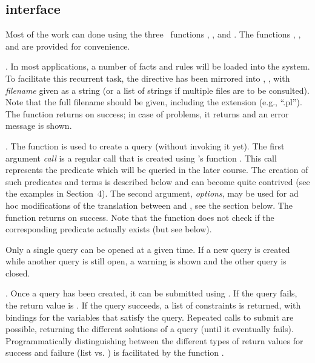 \documentclass[article]{jss}
\begin{document}
\subsection[R interface]{ interface}

Most of the work can done using the 
three \ functions , , and . The
functions , , and  are provided for
convenience.

. In most applications, a number of  facts and
rules will be loaded into the system. To facilitate this recurrent task, 
the  directive  has been mirrored
into , , with \emph{filename} given as a
string (or a list of strings if multiple files are to be consulted). Note that
the full filename should be given, including the extension (e.g., ``.pl'').
The function returns  on success; in case of problems, it
returns  and an error message is shown.

. The function  is used to create a
 query (without invoking it yet). The first 
argument \emph{call} is a regular  call that is created 
using 's function . This call represents
the  predicate which will be queried in the later course. The
creation of such predicates and  terms is described below and
can become quite contrived (see the examples in Section\ 4). The second
argument, \emph{options}, may be used for ad hoc modifications of the
translation between  and , see the section below.
The function returns  on success. Note that the function does not
check if the corresponding  predicate actually exists (but 
see  below).

Only a single query can be opened at a given time. If a new query is created
while another query is still open, a warning is shown and the other query is
closed.

. Once a query has been created, it can be submitted
using . If the query fails, the return value is . If
the query succeeds, a list of constraints is returned, with bindings for the
variables that satisfy the query. Repeated calls to submit are possible,
returning the different solutions of a query (until it eventually fails).
Programmatically distinguishing between the different types of return values for
success and failure (list vs. ) is facilitated by 
the  function .
\end{document}
